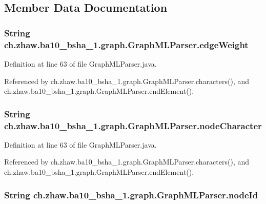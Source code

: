 \subsection{Member Data Documentation}
\hypertarget{classch_1_1zhaw_1_1ba10__bsha__1_1_1graph_1_1GraphMLParser_abd140ea7e8e8b6f312f1823e309eacf4}{
\subsubsection[{edgeWeight}]{\setlength{\rightskip}{0pt plus 5cm}String {\bf ch.zhaw.ba10\_\-bsha\_\-1.graph.GraphMLParser.edgeWeight}}}
\label{classch_1_1zhaw_1_1ba10__bsha__1_1_1graph_1_1GraphMLParser_abd140ea7e8e8b6f312f1823e309eacf4}


Definition at line 63 of file GraphMLParser.java.

Referenced by ch.zhaw.ba10\_\-bsha\_\-1.graph.GraphMLParser.characters(), and ch.zhaw.ba10\_\-bsha\_\-1.graph.GraphMLParser.endElement().\hypertarget{classch_1_1zhaw_1_1ba10__bsha__1_1_1graph_1_1GraphMLParser_a93c139de1399a5b2741e5554f7138ee5}{
\subsubsection[{nodeCharacter}]{\setlength{\rightskip}{0pt plus 5cm}String {\bf ch.zhaw.ba10\_\-bsha\_\-1.graph.GraphMLParser.nodeCharacter}}}
\label{classch_1_1zhaw_1_1ba10__bsha__1_1_1graph_1_1GraphMLParser_a93c139de1399a5b2741e5554f7138ee5}


Definition at line 63 of file GraphMLParser.java.

Referenced by ch.zhaw.ba10\_\-bsha\_\-1.graph.GraphMLParser.characters(), and ch.zhaw.ba10\_\-bsha\_\-1.graph.GraphMLParser.endElement().\hypertarget{classch_1_1zhaw_1_1ba10__bsha__1_1_1graph_1_1GraphMLParser_a08f6eb33a630ada96db0b4359f034e85}{
\subsubsection[{nodeId}]{\setlength{\rightskip}{0pt plus 5cm}String {\bf ch.zhaw.ba10\_\-bsha\_\-1.graph.GraphMLParser.nodeId}}}
\label{classch_1_1zhaw_1_1ba10__bsha__1_1_1graph_1_1GraphMLParser_a08f6eb33a630ada96db0b4359f034e85}


